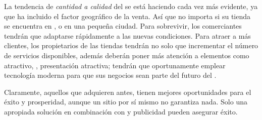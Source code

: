 			La tendencia de \textit{cantidad a calidad} del \ecommerceCOM se está haciendo cada vez más evidente, ya que \internetINT ha incluido el factor geográfico de la venta. Así que no importa si su tienda se encuentra en \newYorkNAME, \londresNAME o en una pequeña ciudad. Para sobrevivir, los comerciantes tendrán que adaptarse rápidamente a las nuevas condiciones. Para atraer a más clientes, los propietarios de las tiendas \online tendrán no solo que incrementar el número de servicios disponibles, además deberán poner más atención a elementos como \designQA atractivo, \userfriendliness, presentación atractiva; tendrán que oportunamente emplear tecnología moderna para que sus negocios sean parte del futuro del \ecommerceCOM.

			Claramente, aquellos que adquieren \estores antes, tienen mejores oportunidades  para el éxito y prosperidad, aunque un sitio \ecommerceCOM por sí mismo no garantiza nada. Solo una apropiada solución \ecommerceCOM en combinación con \emarketing y publicidad pueden asegurar éxito.

